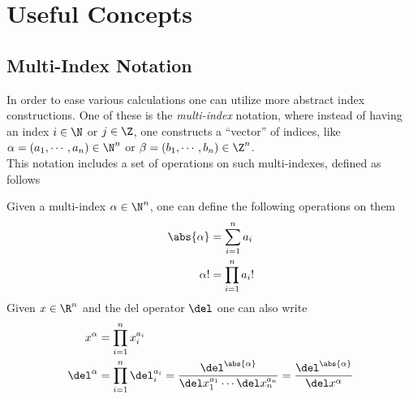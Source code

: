 \documentclass[../mmf.tex]{subfiles}
\begin{document}
\chapter{Useful Concepts}
\section{Multi-Index Notation}
In order to ease various calculations one can utilize more abstract index constructions. One of these is the \textit{multi-index} notation, where instead of having an index $i\in\N$ or $j\in\Z$, one constructs a ``vector'' of indices, like $\alpha=(a_1,\cdots,a_n)\in\N^n$ or $\beta=(b_1,\cdots,b_n)\in\Z^n$.\\
This notation includes a set of operations on such multi-indexes, defined as follows
\begin{thm}
	Given a multi-index $\alpha\in\N^n$, one can define the following operations on them
	\begin{equation}
		\begin{aligned}
			\abs{\alpha}&=\sum_{i=1}^na_i\\
			\alpha!&=\prod_{i=1}^na_i!
		\end{aligned}
		\label{eq:multiindexop}
	\end{equation}
	Given $x\in\R^n$ and the del operator $\del$ one can also write
	\begin{equation}
		\begin{aligned}
			x^\alpha&=\prod_{i=1}^nx_i^{a_i}\\
			\del^\alpha&=\prod_{i=1}^n\del_i^{a_i}=\frac{\del^{\abs{\alpha}}}{\del x_1^{a_1}\cdots\del x_n^{a_n}}=\frac{\del^{\abs{\alpha}}}{\del x^\alpha}
		\end{aligned}
		\label{eq:vecsandmultiindex}
	\end{equation}
\end{thm}
\end{document}
